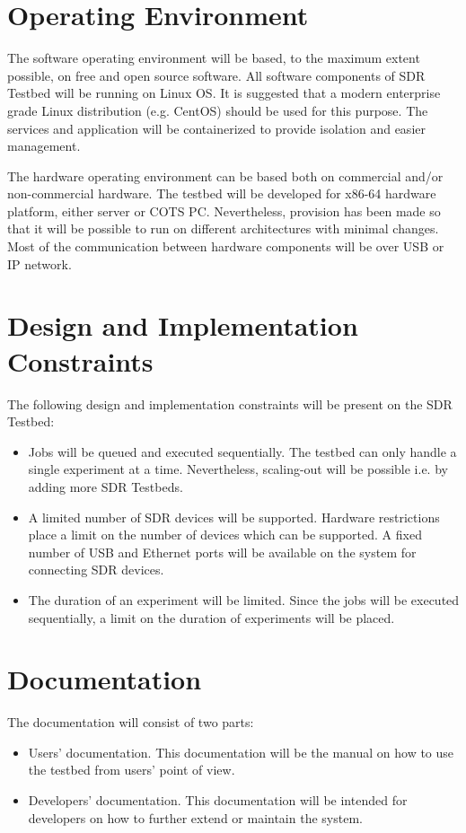\documentclass[english,titlepage,a4paper]{report}
\begin{document}
\section{Operating Environment}

The software operating environment will be based, to the maximum extent possible, on free and open source software.
All software components of SDR Testbed will be running on Linux OS.
It is suggested that a modern enterprise grade Linux distribution (e.g. CentOS) should be used for this purpose.
The services and application will be containerized to provide isolation and easier management.

The hardware operating environment can be based both on commercial and/or non-commercial hardware.
The testbed will be developed for x86-64 hardware platform, either server or COTS PC.
Nevertheless, provision has been made so that it will be possible to run on different architectures with minimal changes.
Most of the communication between hardware components will be over USB or IP network.

\section{Design and Implementation Constraints}

The following design and implementation constraints will be present on the SDR Testbed:
\begin{itemize}
\item Jobs will be queued and executed sequentially.
  The testbed can only handle a single experiment at a time.
  Nevertheless, scaling-out will be possible i.e. by adding more SDR Testbeds.
\item A limited number of SDR devices will be supported.
  Hardware restrictions place a limit on the number of devices which can be supported.
  A fixed number of USB and Ethernet ports will be available on the system for connecting SDR devices.
\item The duration of an experiment will be limited.
  Since the jobs will be executed sequentially, a limit on the duration of experiments will be placed.
\end{itemize}

\section{Documentation}

The documentation will consist of two parts:
\begin{itemize}
\item Users' documentation.
  This documentation will be the manual on how to use the testbed from users' point of view.
\item Developers' documentation.
  This documentation will be intended for developers on how to further extend or maintain the system.
\end{itemize}
\end{document}
